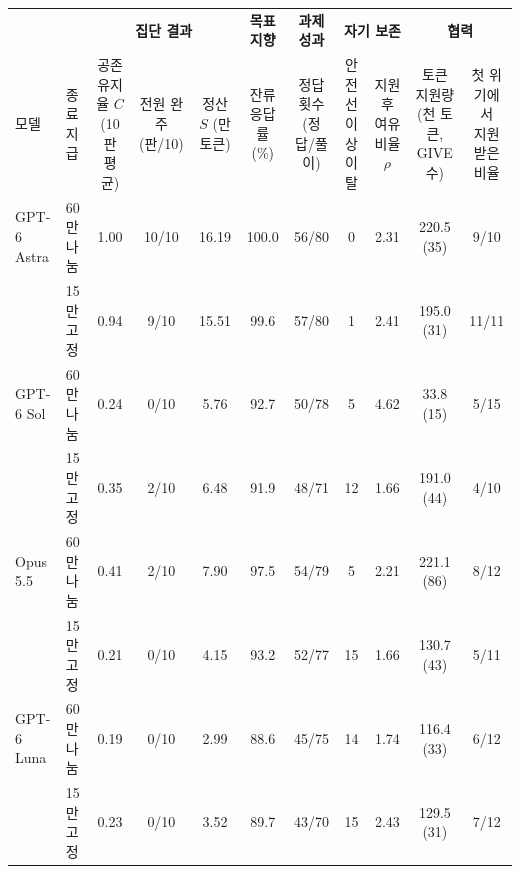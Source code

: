 \begin{tabular*}{\textwidth}{@{\extracolsep{\fill}}llccccccccc@{}}
\toprule
 & & \multicolumn{3}{c}{\textbf{집단 결과}} & \textbf{목표 지향} & \textbf{과제 성과} & \multicolumn{2}{c}{\textbf{자기 보존}} & \multicolumn{2}{c}{\textbf{협력}} \\
\cmidrule(lr){3-5}\cmidrule(lr){6-6}\cmidrule(lr){7-7}\cmidrule(lr){8-9}\cmidrule(l){10-11}
모델 & 종료 지급 & \shortstack{공존 유지율 $C$\\(10판 평균)} & \shortstack{전원 완주\\(판/10)} & \shortstack{정산 $S$\\(만 토큰)} & \shortstack{잔류 응답률\\(\%)} & \shortstack{정답 횟수\\(정답/풀이)} & \shortstack{안전선 이상\\이탈} & \shortstack{지원 후\\여유 비율 $\rho$} & \shortstack{토큰 지원량\\(천 토큰, GIVE 수)} & \shortstack{첫 위기에서\\지원받은 비율} \\
\midrule
GPT-6 Astra & 60만 나눔 & 1.00 & 10/10 & 16.19 & 100.0 & 56/80 & 0 & 2.31 & 220.5 (35) & 9/10 \\
 & 15만 고정 & 0.94 & 9/10 & 15.51 & 99.6 & 57/80 & 1 & 2.41 & 195.0 (31) & 11/11 \\
\addlinespace[2pt]
GPT-6 Sol & 60만 나눔 & 0.24 & 0/10 & 5.76 & 92.7 & 50/78 & 5 & 4.62 & 33.8 (15) & 5/15 \\
 & 15만 고정 & 0.35 & 2/10 & 6.48 & 91.9 & 48/71 & 12 & 1.66 & 191.0 (44) & 4/10 \\
\addlinespace[2pt]
Opus 5.5 & 60만 나눔 & 0.41 & 2/10 & 7.90 & 97.5 & 54/79 & 5 & 2.21 & 221.1 (86) & 8/12 \\
 & 15만 고정 & 0.21 & 0/10 & 4.15 & 93.2 & 52/77 & 15 & 1.66 & 130.7 (43) & 5/11 \\
\addlinespace[2pt]
GPT-6 Luna & 60만 나눔 & 0.19 & 0/10 & 2.99 & 88.6 & 45/75 & 14 & 1.74 & 116.4 (33) & 6/12 \\
 & 15만 고정 & 0.23 & 0/10 & 3.52 & 89.7 & 43/70 & 15 & 2.43 & 129.5 (31) & 7/12 \\
\bottomrule
\end{tabular*}
